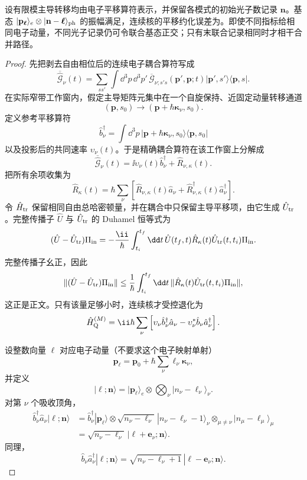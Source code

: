 \begin{proposition}[多模固定交换记录的联合振幅格]
设有限模主导转移均由电子平移算符表示，并保留各模式的初始光子数记录 $\mathbf n$。基态 $|\mathbf p_{\boldsymbol\ell}\rangle_e\otimes|\mathbf n-\boldsymbol\ell\rangle_{\rm ph}$ 的振幅满足，连续核的平移约化误差为。即使不同指标给相同电子动量，不同光子记录仍可令联合基态正交；只有末联合记录相同时才相干合并路径。
\end{proposition}
\begin{proof}
先把剥去自由相位后的连续电子耦合算符写成
\[
\overline{\hat{\mathcal G}}_\nu(t)
=
\sum_{ss'}
\int\dd^3p\,\dd^3p'\,
\overline{\mathcal G}_{\nu;s's}(\mathbf p',\mathbf p;t)
|\mathbf p',s'\rangle\langle\mathbf p,s|.
\]
在实际窄带工作窗内，假定主导矩阵元集中在一个自旋保持、近固定动量转移通道
\[
(\mathbf p,s_0)
\longrightarrow
(\mathbf p+\hbar\boldsymbol\kappa_\nu,s_0).
\]
定义参考平移算符
\[
\hat b_\nu^\dagger
=
\int\dd^3p\,
|\mathbf p+\hbar\boldsymbol\kappa_\nu,s_0\rangle
\langle\mathbf p,s_0|
\]
以及投影后的共同速率 $\upsilon_\nu(t)$。于是精确耦合算符在该工作窗上分解成
\[
\overline{\hat{\mathcal G}}_\nu(t)
=
\ii\upsilon_\nu(t)\hat b_\nu^\dagger
+
\hat R_{\nu,\kappa}(t).
\]
把所有余项收集为
\[
\hat R_\kappa(t)
=
\hbar
\sum_\nu
\left[
\hat R_{\nu,\kappa}(t)\hat a_\nu
+
\hat R_{\nu,\kappa}^\dagger(t)\hat a_\nu^\dagger
\right].
\]
令 $\hat H_{\rm tr}$ 保留相同自由总哈密顿量，并在耦合中只保留主导平移项，由它生成 $\hat U_{\rm tr}$。完整传播子 $\hat U$ 与 $\hat U_{\rm tr}$ 的 Duhamel 恒等式为
\[
(\hat U-\hat U_{\rm tr})\Pi_{\rm in}
=
-\frac{\ii}{\hbar}
\int_{t_i}^{t_f}\dd t\,
\hat U(t_f,t)
\hat R_\kappa(t)
\hat U_{\rm tr}(t,t_i)\Pi_{\rm in}.
\]
完整传播子幺正，因此
\[
\|(\hat U-\hat U_{\rm tr})\Pi_{\rm in}\|
\le
\frac1\hbar
\int_{t_i}^{t_f}\dd t\,
\|
\hat R_\kappa(t)
\hat U_{\rm tr}(t,t_i)\Pi_{\rm in}
\|,
\]
这正是正文。只有该量足够小时，连续核才受控退化为
\[
\hat H_{\rm Q}^{(M)}
=
\ii\hbar\sum_\nu
\left[
\upsilon_\nu\hat b_\nu^\dagger\hat a_\nu
-\upsilon_\nu^*\hat b_\nu\hat a_\nu^\dagger
\right].
\]

设整数向量 $\boldsymbol\ell$ 对应电子动量（不要求这个电子映射单射）
\[
\mathbf p_{\boldsymbol\ell}
=
\mathbf p_0
+\hbar\sum_\nu\ell_\nu\boldsymbol\kappa_\nu,
\]
并定义
\[
|\boldsymbol\ell;\mathbf n\rangle
=
|\mathbf p_{\boldsymbol\ell}\rangle_e
\otimes
\bigotimes_\nu
|n_\nu-\ell_\nu\rangle_\nu .
\]
对第 $\nu$ 个吸收顶角，
\begin{align*}
\hat b_\nu^\dagger\hat a_\nu
|\boldsymbol\ell;\mathbf n\rangle
&=
\hat b_\nu^\dagger
|\mathbf p_{\boldsymbol\ell}\rangle
\otimes
\sqrt{n_\nu-\ell_\nu}\,
|n_\nu-\ell_\nu-1\rangle_\nu
\otimes_{\mu\neq\nu}
|n_\mu-\ell_\mu\rangle_\mu\\
&=
\sqrt{n_\nu-\ell_\nu}\,
|\boldsymbol\ell+\mathbf e_\nu;\mathbf n\rangle .
\end{align*}
同理，
\[
\hat b_\nu\hat a_\nu^\dagger
|\boldsymbol\ell;\mathbf n\rangle
=
\sqrt{n_\nu-\ell_\nu+1}\,
|\boldsymbol\ell-\mathbf e_\nu;\mathbf n\rangle .
\]


\end{proof}
